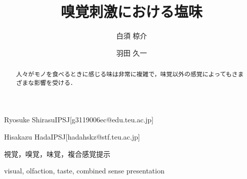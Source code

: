
\title{嗅覚刺激における塩味}





\author{白須 椋介}
       {Ryosuke Shirasu}{IPSJ}[g3119006ec@edu.teu.ac.jp]
\author{羽田 久一}{Hisakazu Hada}{IPSJ}[hadahskz@stf.teu.ac.jp]

\begin{abstract}
人々がモノを食べるときに感じる味は非常に複雑で，味覚以外の感覚によってもさまざまな影響を受ける．

\end{abstract}


\begin{jkeyword}
視覚，嗅覚，味覚，複合感覚提示
\end{jkeyword}

\begin{eabstract}

\end{eabstract}

\begin{ekeyword}
visual, olfaction, taste, combined sense presentation
\end{ekeyword}
